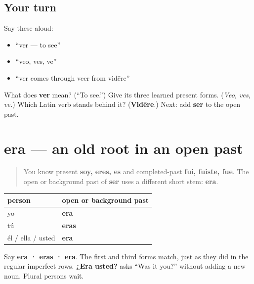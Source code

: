 \subsection*{Your turn}
Say these aloud:

\begin{itemize}
\raggedright
  \item “ver — to see”
  \item “veo, ves, ve”
  \item “ver comes through veer from vidēre”
\end{itemize}

\begin{tcolorbox}[breakable,colback=teal!4,colframe=teal!35!black,title={Before you move on}]
What does \textbf{ver} mean? (“To see.”) Give its three learned present forms. (\emph{Veo, ves, ve.}) Which Latin verb stands behind it? (\textbf{Vidēre}.) Next: add \textbf{ser} to the open past.
\end{tcolorbox}
\section[era]{era — an old root in an open past}

\label{lesson:ES-C16-ser-imperfecto}



\begin{quote}
You know present \textbf{soy, eres, es} and completed-past \textbf{fui, fuiste, fue}. The open or background past of \textbf{ser} uses a different short stem: \textbf{era}.
\end{quote}

\begin{grammarlens}[title={Grammar Lens: the singular ser row}]
\noindent
\begin{tabularx}{\linewidth}{@{}>{\raggedright\arraybackslash}X>{\raggedright\arraybackslash}X@{}}
\toprule
\textbf{person} & \textbf{open or background past} \\
\midrule
yo & \textbf{era} \\
tú & \textbf{eras} \\
él / ella / usted & \textbf{era} \\
\bottomrule
\end{tabularx}

Say \textbf{era · eras · era}. The first and third forms match, just as they did in the regular imperfect rows. \textbf{¿Era usted?} asks “Was it you?” without adding a new noun. Plural persons wait.
\end{grammarlens}

